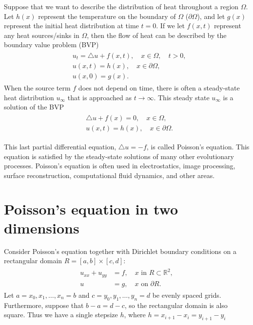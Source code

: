 \label{lab:poisson2d}

Suppose that we want to describe the distribution of heat throughout a region $\Omega$.
Let $h(x)$ represent the temperature on the boundary of $\Omega$ ($\partial \Omega$), and let $g(x)$ represent the initial heat distribution at time $t = 0$.
If we let $f(x,t)$ represent any heat sources/sinks in $\Omega$, then the flow of heat can be described by the boundary value problem (BVP)
\begin{align}
	\begin{split}
		& { } u_t = \triangle u + f(x,t), \quad x \in \Omega, \quad t >0,\\
		& { }u(x,t) = h(x), \quad x \in \partial \Omega, \\
		& { }u(x,0) = g(x).
	\end{split}
\end{align}
When the source term $f$ does not depend on time, there is often a steady-state heat distribution $u_{\infty}$ that is approached as $t \to \infty$.
This steady state $u_{\infty}$ is a solution of the BVP
\begin{align}
	\begin{split}
		& { }  \triangle u + f(x) = 0, \quad x \in \Omega,\\
		& { }u(x,t) = h(x), \quad x \in \partial \Omega.
	\end{split}
\end{align}

This last partial differential equation, $\triangle u = -f$, is called Poisson's equation.
This equation is satisfied by the steady-state solutions of many other evolutionary processes.
Poisson's equation is often used in electrostatics, image processing, surface reconstruction, computational fluid dynamics, and other areas.


\section*{Poisson's equation in two dimensions}

 Consider Poisson's equation together with Dirichlet boundary conditions on a rectangular domain $R = [a,b]\times [c,d]$:
 \begin{align}
	\begin{split}
 	u_{xx} + u_{yy} &= f,\quad x \text{ in } R \subset \mathbb{R}^2,\\
 	u &= g, \quad x \text{ on } \partial R.
	\end{split}\label{eqn:2d_poisson}
\end{align}
Let $a = x_0, x_1, \ldots, x_n = b$ and $c = y_0, y_1, \ldots, y_n = d$ be evenly spaced grids.
Furthermore, suppose that $b-a=d-c$, so the rectangular domain is also square.
Thus we have a single stepsize $h$, where $h = x_{i+1}-x_i = y_{i+1}-y_i$

